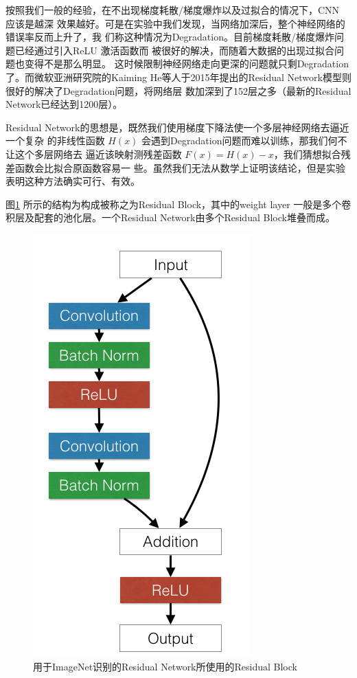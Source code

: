 按照我们一般的经验，在不出现梯度耗散/梯度爆炸以及过拟合的情况下，CNN 应该是越深
效果越好。可是在实验中我们发现，当网络加深后，整个神经网络的错误率反而上升了，我
们称这种情况为Degradation。目前梯度耗散/梯度爆炸问题已经通过引入ReLU 激活函数而
被很好的解决\cite{Nair:2010vq}，而随着大数据的出现过拟合问题也变得不是那么明显。
这时候限制神经网络走向更深的问题就只剩Degradation了。而微软亚洲研究院的Kaiming
He等人于2015年提出的Residual Network模型则很好的解决了Degradation问题，将网络层
数加深到了152层之多（最新的Residual Network已经达到1200层）。

Residual Network的思想是，既然我们使用梯度下降法使一个多层神经网络去逼近一个复杂
的非线性函数 $H(x)$ 会遇到Degradation问题而难以训练，那我们何不让这个多层网络去
逼近该映射测残差函数 $F(x) = H(x) - x$，我们猜想拟合残差函数会比拟合原函数容易一
些。虽然我们无法从数学上证明该结论，但是实验表明这种方法确实可行、有效。

图\ref{Fig:ResBlockActual} 所示的结构为构成被称之为Residual Block，其中的weight layer
一般是多个卷积层及配套的池化层。一个Residual Network由多个Residual Block堆叠而成。

\begin{figure}
  \centering
  \includegraphics[height=0.5\textheight,
  keepaspectratio]{./Figure/ResBlockActual.png}
  \caption{用于ImageNet识别的Residual Network所使用的Residual
    Block}\label{Fig:ResBlockActual}
\end{figure}


